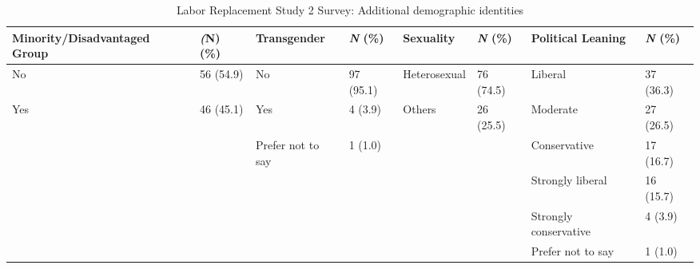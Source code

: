 \begin{table*}[htpb]
    \centering
    \footnotesize
    \begin{tabular}{ll|ll|ll|ll}
    \toprule
         \textbf{Minority/Disadvantaged Group} & \textbf{\textit(N) (\%)} & \textbf{Transgender} & \textbf{\textit{N} (\%)} & \textbf{Sexuality} & \textbf{\textit{N} (\%)} & \textbf{Political Leaning} & \textbf{\textit{N} (\%)} \\
         \midrule
No & 56 (54.9) & No & 97 (95.1) & Heterosexual & 76 (74.5) & Liberal & 37 (36.3)\\
Yes & 46 (45.1) & Yes & 4 (3.9) & Others & 26 (25.5) & Moderate & 27 (26.5)\\
 &  & Prefer not to say & 1 (1.0) & & & Conservative & 17 (16.7)\\
 &  &  &  &  &  & Strongly liberal & 16 (15.7)\\
 &  &  &  &  &  & Strongly conservative & 4 (3.9)\\
 &  &  &  &  &  & Prefer not to say & 1 (1.0)\\
\bottomrule
    \end{tabular}
    \caption{Labor Replacement Study 2 Survey: Additional demographic identities}
    \label{app:demographics-2-jobs-p2}
\end{table*}